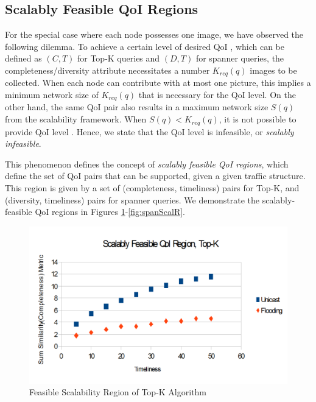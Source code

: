 \subsection{Scalably Feasible QoI Regions}
For the special case where each node possesses one image, we have observed the following dilemma. To achieve a certain level of desired QoI , which can be defined as $(C,T)$ for Top-K queries and $(D,T)$ for spanner queries, the completeness/diversity attribute necessitates a number $K_{req}(q)$ images to be collected. When each node can contribute with at most one picture, this implies a minimum network size of $K_{req}(q)$ that is necessary for the QoI level. On the other hand, the same QoI pair also results in a maximum network size $S(q)$ from the scalability framework.
When $S(q)<K_{req}(q)$, it is not possible to provide QoI level . Hence, we state that the QoI level  is infeasible, or \emph{scalably infeasible}.

This phenomenon defines the concept of \emph{scalably feasible QoI regions}, which define the set of QoI pairs that can be supported, given a given traffic structure. This region is given by a set of (completeness, timeliness) pairs for Top-K, and (diversity, timeliness) pairs for spanner queries. 
We demonstrate the scalably-feasible QoI regions in Figures \ref{fig:topkScalR}-\ref{fig:spanScalR}.


\begin{figure}
    \includegraphics[scale=0.35]{figures/topkScalR.pdf}
    \caption{Feasible Scalability Region of Top-K Algorithm}
    \label{fig:topkScalR}
\end{figure}

